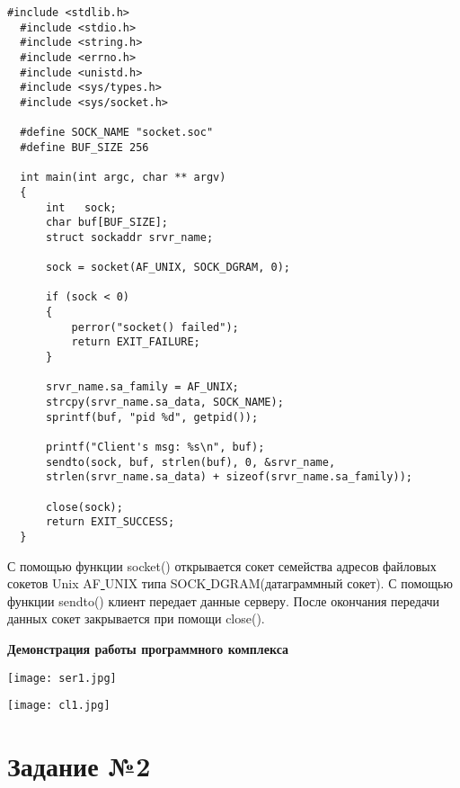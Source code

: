 \documentclass[a4paper,14pt]{extreport} %
\begin{document}
\begin{lstlisting}[caption=Код клиента fsclient.c]
  #include <stdlib.h>
  #include <stdio.h>
  #include <string.h>
  #include <errno.h>
  #include <unistd.h>
  #include <sys/types.h>
  #include <sys/socket.h>

  #define SOCK_NAME "socket.soc"
  #define BUF_SIZE 256

  int main(int argc, char ** argv)
  {
      int   sock;
      char buf[BUF_SIZE];
      struct sockaddr srvr_name;
      
      sock = socket(AF_UNIX, SOCK_DGRAM, 0);

      if (sock < 0)
      {
          perror("socket() failed");
          return EXIT_FAILURE;
      }

      srvr_name.sa_family = AF_UNIX;
      strcpy(srvr_name.sa_data, SOCK_NAME);
      sprintf(buf, "pid %d", getpid());

      printf("Client's msg: %s\n", buf);
      sendto(sock, buf, strlen(buf), 0, &srvr_name,
      strlen(srvr_name.sa_data) + sizeof(srvr_name.sa_family));

      close(sock);
      return EXIT_SUCCESS;
  }
\end{lstlisting}

С помощью функции socket() открывается сокет семейства адресов файловых сокетов Unix AF\underline{ }UNIX типа SOCK\underline{ }DGRAM(датаграммный сокет). С помощью  функции sendto() клиент передает данные серверу. После окончания передачи данных сокет закрывается при помощи close().

\textbf{Демонстрация работы программного комплекса}

\texttt{[image: ser1.jpg]}

\texttt{[image: cl1.jpg]}

\hfill
\newpage
\section*{Задание №2}
\end{document}
